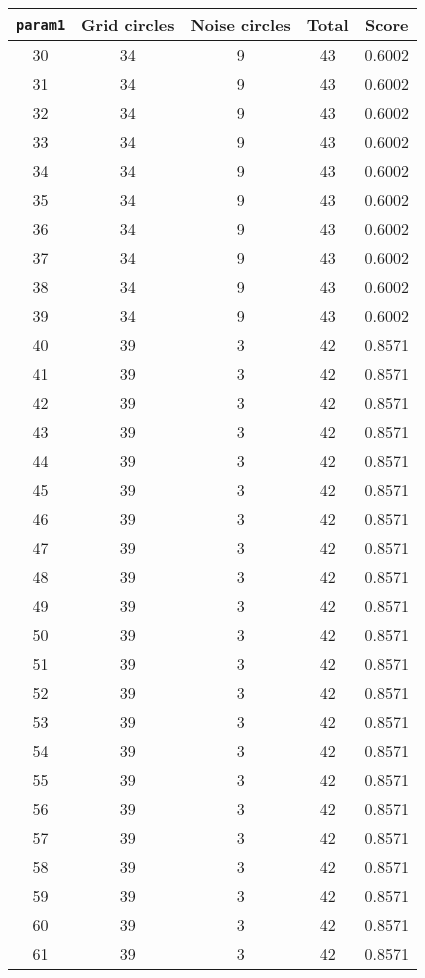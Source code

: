 \documentclass[letterpaper, 12pt]{article}
\begin{document}
\begin{longtable}{|c|c|c|c|c|}
\hline
\textbf{\texttt{param1}} & \textbf{Grid circles} & \textbf{Noise circles} & \textbf{Total} & \textbf{Score} \\
\hline
30 & 34 & 9 & 43 & 0.6002 \\
\hline
31 & 34 & 9 & 43 & 0.6002 \\
\hline
32 & 34 & 9 & 43 & 0.6002 \\
\hline
33 & 34 & 9 & 43 & 0.6002 \\
\hline
34 & 34 & 9 & 43 & 0.6002 \\
\hline
35 & 34 & 9 & 43 & 0.6002 \\
\hline
36 & 34 & 9 & 43 & 0.6002 \\
\hline
37 & 34 & 9 & 43 & 0.6002 \\
\hline
38 & 34 & 9 & 43 & 0.6002 \\
\hline
39 & 34 & 9 & 43 & 0.6002 \\
\hline
40 & 39 & 3 & 42 & 0.8571 \\
\hline
41 & 39 & 3 & 42 & 0.8571 \\
\hline
42 & 39 & 3 & 42 & 0.8571 \\
\hline
43 & 39 & 3 & 42 & 0.8571 \\
\hline
44 & 39 & 3 & 42 & 0.8571 \\
\hline
45 & 39 & 3 & 42 & 0.8571 \\
\hline
46 & 39 & 3 & 42 & 0.8571 \\
\hline
47 & 39 & 3 & 42 & 0.8571 \\
\hline
48 & 39 & 3 & 42 & 0.8571 \\
\hline
49 & 39 & 3 & 42 & 0.8571 \\
\hline
50 & 39 & 3 & 42 & 0.8571 \\
\hline
51 & 39 & 3 & 42 & 0.8571 \\
\hline
52 & 39 & 3 & 42 & 0.8571 \\
\hline
53 & 39 & 3 & 42 & 0.8571 \\
\hline
54 & 39 & 3 & 42 & 0.8571 \\
\hline
55 & 39 & 3 & 42 & 0.8571 \\
\hline
56 & 39 & 3 & 42 & 0.8571 \\
\hline
57 & 39 & 3 & 42 & 0.8571 \\
\hline
58 & 39 & 3 & 42 & 0.8571 \\
\hline
59 & 39 & 3 & 42 & 0.8571 \\
\hline
60 & 39 & 3 & 42 & 0.8571 \\
\hline
61 & 39 & 3 & 42 & 0.8571 \\

\end{longtable}
\end{document}
